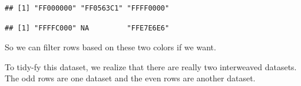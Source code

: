 \documentclass[12pt,letterpaperpaper,openany]{book}
\newenvironment{Shaded}{\begin{snugshade}}{\end{snugshade}}
\newcommand{\KeywordTok}[1]{\textcolor[rgb]{0.13,0.29,0.53}{\textbf{#1}}}
\newcommand{\NormalTok}[1]{#1}
\newcommand{\OperatorTok}[1]{\textcolor[rgb]{0.81,0.36,0.00}{\textbf{#1}}}
\begin{document}
\begin{Shaded}
\end{Shaded}

\begin{verbatim}
## [1] "FF000000" "FF0563C1" "FFFF0000"
\end{verbatim}

\begin{Shaded}
\end{Shaded}

\begin{verbatim}
## [1] "FFFFC000" NA         "FFE7E6E6"
\end{verbatim}

So we can filter rows based on these two colors if we want.

To tidy-fy this dataset, we realize that there are really two interweaved datasets.
The odd rows are one dataset and the even rows are another dataset.
\end{document}
